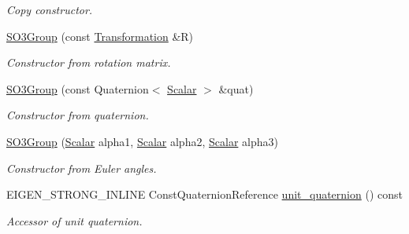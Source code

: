 \begin{DoxyCompactItemize}
\begin{DoxyCompactList}\small\item\em Copy constructor. \end{DoxyCompactList}\item 
\hyperlink{class_sophus_1_1_s_o3_group_aca43c3b5f6a9f2376119c9d5e1b16f7f}{S\+O3\+Group} (const \hyperlink{class_sophus_1_1_s_o3_group_a7fd4c61cae92c71a763d4f999c87fb9b}{Transformation} \&R)
\begin{DoxyCompactList}\small\item\em Constructor from rotation matrix. \end{DoxyCompactList}\item 
\hyperlink{class_sophus_1_1_s_o3_group_a89369d9052724158090dfbaa96d803dd}{S\+O3\+Group} (const Quaternion$<$ \hyperlink{class_sophus_1_1_s_o3_group_a2b1432aa3eac9b174e41df7ce504cb06}{Scalar} $>$ \&quat)
\begin{DoxyCompactList}\small\item\em Constructor from quaternion. \end{DoxyCompactList}\item 
\hyperlink{class_sophus_1_1_s_o3_group_affa7204a5a51284edc7125eea9659014}{S\+O3\+Group} (\hyperlink{class_sophus_1_1_s_o3_group_a2b1432aa3eac9b174e41df7ce504cb06}{Scalar} alpha1, \hyperlink{class_sophus_1_1_s_o3_group_a2b1432aa3eac9b174e41df7ce504cb06}{Scalar} alpha2, \hyperlink{class_sophus_1_1_s_o3_group_a2b1432aa3eac9b174e41df7ce504cb06}{Scalar} alpha3)
\begin{DoxyCompactList}\small\item\em Constructor from Euler angles. \end{DoxyCompactList}\item 
E\+I\+G\+E\+N\+\_\+\+S\+T\+R\+O\+N\+G\+\_\+\+I\+N\+L\+I\+NE Const\+Quaternion\+Reference \hyperlink{class_sophus_1_1_s_o3_group_aa29eb341fa1c3a4b4addfe22e14e80a0}{unit\+\_\+quaternion} () const 
\begin{DoxyCompactList}\small\item\em Accessor of unit quaternion. \end{DoxyCompactList}\end{DoxyCompactItemize}
